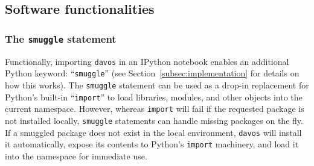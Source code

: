 \documentclass[preprint,12pt,a4paper]{elsarticle}
\begin{document}
\subsection{Software functionalities}
\subsubsection{The \texttt{smuggle} statement}\label{subsec:smuggle}
Functionally, importing \texttt{davos} in an IPython notebook enables an additional Python keyword: ``\texttt{smuggle}'' (see Section~\ref{subsec:implementation} for details on how this works).
The \texttt{smuggle} statement can be used as a drop-in replacement for Python's built-in ``\texttt{import}'' to load libraries, modules, and other objects into the current namespace.
However, whereas \texttt{import} will fail if the requested package is not installed locally, \texttt{smuggle} statements can handle missing packages on the fly.
If a smuggled package does not exist in the local environment, \texttt{davos} will install it automatically, expose its contents to Python's \texttt{import} machinery, and load it into the namespace for immediate use.
\end{document}
